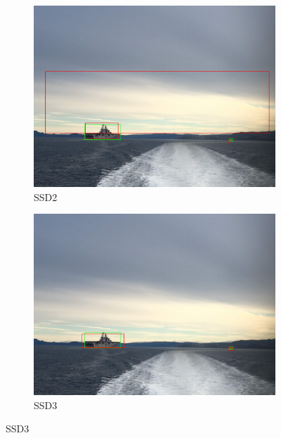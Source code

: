 \begin{figure}[h!]
\begin{subfigure}{.5\textwidth}
  \centering
  \includegraphics[width=0.75\linewidth]{results/case_buildings/ssdtrf/ssd2/grov2/IMG_2226.jpg}
  \caption{SSD2}
\end{subfigure}%
\begin{subfigure}{.5\textwidth}
  \centering
  \includegraphics[width=.75\linewidth]{results/case_buildings/ssdtrf/ssd3/grov2/IMG_2226.jpg}
  \caption{SSD3}
\end{subfigure}


\end{figure}

